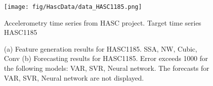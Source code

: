 \documentclass[12pt]{article}
\begin{document}
\begin{figure}
\centering
\texttt{[image: fig/HascData/data\_HASC1185.png]}
\caption{Accelerometry time series from HASC project. Target time series	HASC1185	}
\end{figure}


\begin{figure}
\centering
{}
\caption{(a)	Feature generation results for	HASC1185.	SSA, NW, Cubic, Conv	(b)	Forecasting results for	HASC1185.		Error exceeds 1000 for the following models: VAR, SVR, Neural network. The forecasts for VAR, SVR, Neural network are not displayed.	}
\end{figure}
\end{document}
